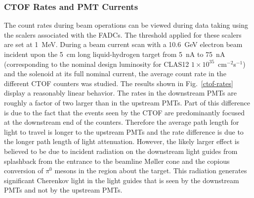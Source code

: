 \documentclass{elsart}
\begin{document}
\subsubsection{CTOF Rates and PMT Currents}

The count rates during beam operations can be viewed during data taking using the scalers associated
with the FADCs. The threshold applied for these scalers are set at 1~MeV. During a beam current scan
with a 10.6~GeV electron beam incident upon the 5~cm long liquid-hydrogen target from 5~nA to 75~nA
(corresponding to the nominal design luminosity for CLAS12 $1 \times 10^{35}$~cm$^{-2}$s$^{-1}$) and
the solenoid at its full nominal current, the average count rate in the different CTOF counters was
studied. The results shown in Fig.~\ref{ctof-rates} display a reasonably linear behavior. The rates in
the downstream PMTs are roughly a factor of two larger than in the upstream PMTs. Part of this
difference is due to the fact that the events seen by the CTOF are predominantly focused at the
downstream end of the counters. Therefore the average path length for light to travel is longer to
the upstream PMTs and the rate difference is due to the longer path length of light attenuation. However,
the likely larger effect is believed to be due to incident radiation on the downstream light guides from
splashback from the entrance to the beamline M{\o}ller cone and the copious conversion of $\pi^0$
mesons in the region about the target. This radiation generates significant Cherenkov light in the light
guides that is seen by the downstream PMTs and not by the upstream PMTs.
\end{document}
